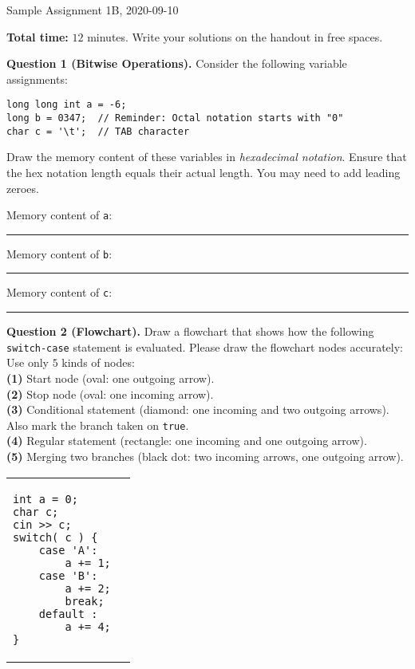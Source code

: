 \documentclass[11pt]{article}
\begin{document}
\thispagestyle{empty}



\begin{center}
{\Large Sample Assignment 1B, 2020-09-10}
\end{center}

{\bf Total time:} $12$ minutes.
Write your solutions on the handout in free spaces.

\vspace{10pt}
{\bf Question 1 (Bitwise Operations).} Consider the following variable assignments:
\begin{Verbatim}[frame=single]
long long int a = -6;  
long b = 0347;  // Reminder: Octal notation starts with "0"
char c = '\t';  // TAB character
\end{Verbatim}

Draw the memory content of these variables in {\em hexadecimal notation}. Ensure that the hex notation
length equals their actual length. You may need to add leading zeroes.

\vspace{10pt}
Memory content of {\tt a}: \rule{4cm}{0.4pt} 

\vspace{10pt}
Memory content of {\tt b}: \rule{4cm}{0.4pt} 

\vspace{10pt}
Memory content of {\tt c}: \rule{4cm}{0.4pt} 




\vspace{20pt}
{\bf Question 2 (Flowchart).} 
Draw a flowchart that shows how the following {\tt switch-case} statement is evaluated. 
Please draw the flowchart nodes accurately: Use only $5$ kinds of nodes:\\
{\bf (1)} Start node (oval: one outgoing arrow).\\
{\bf (2)} Stop node (oval: one incoming arrow).\\
{\bf (3)} Conditional statement (diamond: one incoming and two outgoing arrows). Also mark the branch taken on {\tt true}. \\
{\bf (4)} Regular statement (rectangle: one incoming and one outgoing arrow).\\
{\bf (5)} Merging two branches (black dot: two incoming arrows, one outgoing arrow).


\vspace{5mm}
\begin{tabular}{@{}ll@{}} 
\begin{minipage}{0.48\columnwidth}
\begin{Verbatim}[frame=single]
int a = 0;
char c; 
cin >> c; 
switch( c ) {
    case 'A':
        a += 1;
    case 'B':
        a += 2;
		break;
    default :
        a += 4;
}
\end{Verbatim}
\end{minipage} &
\begin{minipage}{0.5\columnwidth}
\mbox{}
\end{minipage}
\end{tabular}
\end{document}

